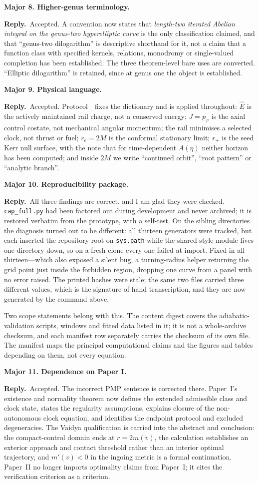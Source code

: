 \documentclass[11pt]{article}
\newcommand{\reply}{\par\noindent\textbf{Reply.}\ }
\newcommand{\R}[1]{\par\medskip\noindent\textbf{#1}\par\nopagebreak}
\begin{document}
\R{Major 8. Higher-genus terminology.}
\reply Accepted. A convention now states that \emph{length-two iterated Abelian
integral on the genus-two hyperelliptic curve} is the only classification claimed,
and that ``genus-two dilogarithm'' is descriptive shorthand for it, not a claim that
a function class with specified kernels, relations, monodromy or single-valued
completion has been established. The three theorem-level bare uses are converted.
``Elliptic dilogarithm'' is retained, since at genus one the object is established.

\R{Major 9. Physical language.}
\reply Accepted. Protocol~\msProtNames\ fixes the dictionary and is applied
throughout: $\hat E$ is the actively maintained rail charge, not a conserved energy;
$J=p_\varphi$ is the axial control costate, not mechanical angular momentum; the
rail minimises a selected clock, not thrust or fuel; $r_e=2M$ is the conformal
stationary limit; $r_+$ is the seed Kerr null surface, with the note that for
time-dependent $A(\eta)$ neither horizon has been computed; and inside $2M$ we write
``continued orbit'', ``root pattern'' or ``analytic branch''.

\R{Major 10. Reproducibility package.}
\reply All three findings are correct, and I am glad they were checked.
\texttt{cap\_full.py} had been factored out during development and never archived;
it is restored verbatim from the prototype, with a self-test. On the sibling
directories the diagnosis turned out to be different: all thirteen generators were
tracked, but each inserted the repository root on \texttt{sys.path} while the shared
style module lives one directory down, so on a fresh clone every one failed at
import. Fixed in all thirteen---which also exposed a silent bug, a turning-radius
helper returning the grid point just inside the forbidden region, dropping one curve
from a panel with no error raised. The printed hashes were stale; the same two files
carried three different values, which is the signature of hand transcription, and
they are now generated by the command above.

Two scope statements belong with this. The content digest covers the
adiabatic-validation scripts, windows and fitted data listed in it; it is not a
whole-archive checksum, and each manifest row separately carries the checksum of its
own file. The manifest maps the principal computational claims and the figures and
tables depending on them, not every equation.

\R{Major 11. Dependence on Paper I.}
\reply Accepted. The incorrect PMP sentence is corrected there. Paper~I's existence
and normality theorem now defines the extended admissible class and clock state,
states the regularity assumptions, explains closure of the non-autonomous clock
equation, and identifies the endpoint protocol and excluded degeneracies. The Vaidya
qualification is carried into the abstract and conclusion: the compact-control
domain ends at $r=2m(v)$, the calculation establishes an exterior approach and
contact threshold rather than an interior optimal trajectory, and $m'(v)<0$ in the
ingoing metric is a formal continuation. Paper~II no longer imports optimality
claims from Paper~I; it cites the verification criterion as a criterion.
\end{document}
